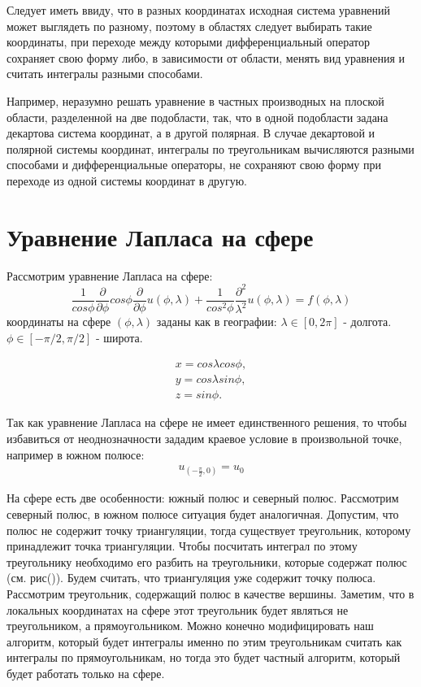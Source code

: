 \documentclass[a4paper]{article}
\begin{document}
Следует иметь ввиду, что в разных координатах исходная система
уравнений может выглядеть по разному, поэтому в областях следует
выбирать такие координаты, при переходе между которыми дифференциальный
оператор сохраняет свою форму либо, в зависимости от области, менять вид
уравнения и считать интегралы разными способами.

Например, неразумно решать уравнение в частных производных на плоской
области, разделенной на две подобласти, так, что в одной подобласти
задана декартова система координат, а в другой полярная. В случае
декартовой и полярной системы координат, интегралы по треугольникам
вычисляются разными способами и дифференциальные
операторы, не сохраняют свою форму при переходе из одной системы
координат в другую.

\section*{Уравнение Лапласа на сфере}
Рассмотрим уравнение Лапласа на сфере:
\begin{equation*}
\frac{1}{cos\phi}\frac{\partial}{\partial\phi}
cos\phi\frac{\partial}{\partial\phi} u(\phi, \lambda) +
\frac{1}{cos^2\phi}\frac{\partial^2}
{\lambda^2} u(\phi, \lambda) = f(\phi, \lambda)
\end{equation*}
координаты на сфере $(\phi,\lambda)$ заданы как в географии:
$\lambda \in [0,2\pi]$ - долгота. $\phi \in [-\pi/2,\pi/2]$ - широта.

\begin{equation}\label{sphere_coord}
\begin{split}
x = cos \lambda cos \phi, \\
y = cos \lambda sin \phi, \\
z = sin \phi. 
\end{split}
\end{equation}

Так как уравнение Лапласа на сфере не имеет единственного решения, то
чтобы избавиться от неоднозначности зададим краевое условие в
произвольной точке, например в южном полюсе:
\begin{equation*}
\begin{split}
u_{(-\frac{\pi}{2},0)}=u_0
\end{split}
\end{equation*} 

На сфере есть две особенности: южный полюс и северный
полюс. Рассмотрим северный полюс, в южном полюсе ситуация будет
аналогичная. Допустим, что полюс не содержит точку триангуляции, тогда
существует треугольник, которому принадлежит точка триангуляции. Чтобы
посчитать интеграл по этому треугольнику необходимо его разбить на
треугольники, которые содержат полюс (см. рис()). Будем считать,
что триангуляция уже содержит точку полюса. Рассмотрим треугольник,
содержащий полюс в качестве вершины. Заметим, что в локальных
координатах на сфере этот треугольник будет являться не треугольником,
а прямоугольником. Можно конечно модифицировать наш алгоритм, который
будет интегралы именно по этим треугольникам считать как интегралы по
прямоугольникам, но тогда это будет частный алгоритм, который будет
работать только на сфере. 
\end{document}
